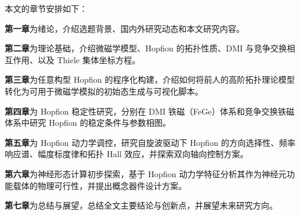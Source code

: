 本文的章节安排如下：

\textbf{第一章}为绪论，介绍选题背景、国内外研究动态和本文研究内容。

\textbf{第二章}为理论基础，介绍微磁学模型、Hopfion 的拓扑性质、DMI 与竞争交换相互作用、以及 Thiele 集体坐标方程。

\textbf{第三章}为任意构型 Hopfion 的程序化构建，介绍如何将前人的高阶拓扑理论模型转化为可用于微磁学模拟的初始态生成与可视化脚本。

\textbf{第四章}为 Hopfion 稳定性研究，分别在 DMI 铁磁（FeGe）体系和竞争交换铁磁体系中研究 Hopfion 的稳定条件与参数相图。

\textbf{第五章}为 Hopfion 动力学调控，研究自旋波驱动下 Hopfion 的方向选择性、频率响应谱、幅度标度律和拓扑 Hall 效应，并探索双向轴向控制方案。

\textbf{第六章}为神经形态计算初步探索，基于 Hopfion 动力学特征分析其作为神经元功能载体的物理可行性，并提出概念器件设计方案。

\textbf{第七章}为总结与展望，总结全文主要结论与创新点，并展望未来研究方向。
